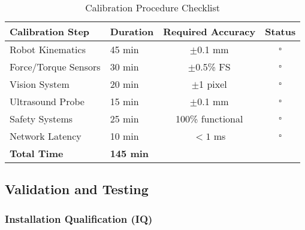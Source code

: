 \begin{table}[htbp]
\centering
\caption{Calibration Procedure Checklist}
\label{tab:app-calibration}
\begin{tabular}{|l|l|c|c|}
\hline
\textbf{Calibration Step} & \textbf{Duration} & \textbf{Required Accuracy} & \textbf{Status} \\
\hline
Robot Kinematics & 45 min & $\pm$0.1 mm & $\square$ \\
Force/Torque Sensors & 30 min & $\pm$0.5\% FS & $\square$ \\
Vision System & 20 min & $\pm$1 pixel & $\square$ \\
Ultrasound Probe & 15 min & $\pm$0.1 mm & $\square$ \\
Safety Systems & 25 min & 100\% functional & $\square$ \\
Network Latency & 10 min & $< 1$ ms & $\square$ \\
\hline
\textbf{Total Time} & \textbf{145 min} & & \\
\hline
\end{tabular}
\end{table}

\subsection{Validation and Testing}

\subsubsection{Installation Qualification (IQ)}

